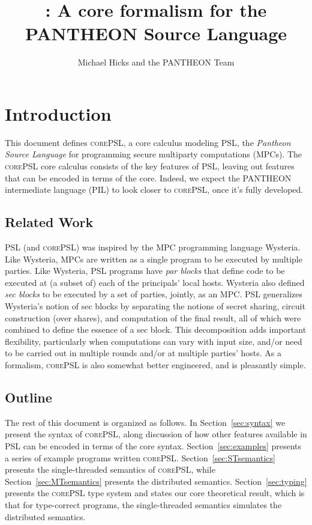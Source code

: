 \documentclass[10pt]{article}
\title{\lang: A core formalism for the PANTHEON Source Language}
\author{Michael Hicks and the PANTHEON Team}
\newcommand{\lang}{\textsc{corePSL}\xspace}
\begin{document}
\maketitle

\section{Introduction}

This document defines \lang, a core calculus modeling PSL, the
\emph{Pantheon Source Language} for programming secure multiparty
computations (MPCs). The \lang core calculus consists of the key features of PSL,
leaving out features that can be encoded in terms of the core. Indeed,
we expect the PANTHEON intermediate language (PIL) to look closer to
\lang, once it's fully developed.

\subsection{Related Work}

PSL (and \lang) was inspired by the MPC programming language
Wysteria. Like Wysteria, MPCs are written as a single program to be
executed by multiple parties. Like Wysteria, PSL programs have
\emph{par blocks} that define code to be executed at (a subset of)
each of the principals' local hosts. Wysteria also defined \emph{sec
  blocks} to be executed by a set of parties, jointly, as an
MPC\@. PSL generalizes Wysteria's notion of sec blocks by separating
the notions of secret sharing, circuit construction (over shares), and
computation of the final result, all of which were combined to define
the essence of a sec block. This decomposition adds important
flexibility, particularly when computations can vary with input size,
and/or need to be carried out in multiple rounds and/or at multiple
parties' hosts. As a formalism, \lang is also somewhat better
engineered, and is pleasantly simple.

\subsection{Outline}

The rest of this document is organized as follows. In
Section~\ref{sec:syntax} we present the syntax of \lang, along
discussion of how other features available in PSL can be encoded in
terms of the core syntax. Section~\ref{sec:examples} presents a series
of example programs written \lang. Section~\ref{sec:STsemantics}
presents the single-threaded semantics of \lang, while
Section~\ref{sec:MTsemantics} presents the distributed
semantics. Section~\ref{sec:typing} presents the \lang type system and
states our core theoretical result, which is that for type-correct
programs, the single-threaded semantics simulates the distributed
semantics.
\end{document}
